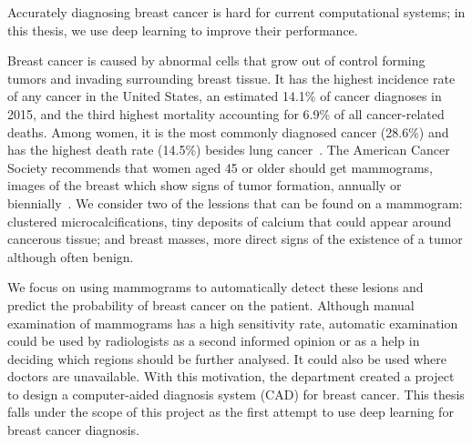 \begin{comment} 
Hook(first paragarpah) : Automatic breast cancer diagnosis is a very difficult taks for current automatic computationnal systems. In this article,  we apply deep learning techniques to digital mammogrpahic images and obtain better results than presented to date. We show or prove or use this technique to obtain this... (when we have results)
Automatic breast cancer diagnosis is a very difficult task for current computational systems. In this thesis, we apply deep learning techniques to digital mammographic images in order to improve the performance of such systems. We layout here the hypotheses, experiments and goals of our future research.
\end{comment}
Accurately diagnosing breast cancer is hard for current computational systems; in this thesis, we use deep learning to improve their performance.

Breast cancer is caused by abnormal cells that grow out of control forming tumors and invading surrounding breast tissue.
It has the highest incidence rate of any cancer in the United States, an estimated 14.1\% of cancer diagnoses in 2015, and the third highest mortality accounting for 6.9\% of all cancer-related deaths. Among women, it is the most commonly diagnosed cancer (28.6\%) and has the highest death rate (14.5\%) besides lung cancer~\cite{ACS2015}. The American Cancer Society recommends that women aged 45 or older should get mammograms, images of the breast which show signs of tumor formation, annually or biennially~\cite{Oeffinger2015}. We consider two of the lessions that can be found on a mammogram: clustered microcalcifications, tiny deposits of calcium that could appear around cancerous tissue; and breast masses, more direct signs of the existence of a tumor although often benign.

We focus on using mammograms to automatically detect these lesions and predict the probability of breast cancer on the patient. Although manual examination of mammograms has a high sensitivity rate, automatic examination could be used by radiologists as a second informed opinion or as a help in deciding which regions should be further analysed. It could also be used where doctors are unavailable. With this motivation, the department created a project to design a computer-aided diagnosis system (CAD) for breast cancer. This thesis falls under the scope of this project as the first attempt to use deep learning for breast cancer diagnosis.

